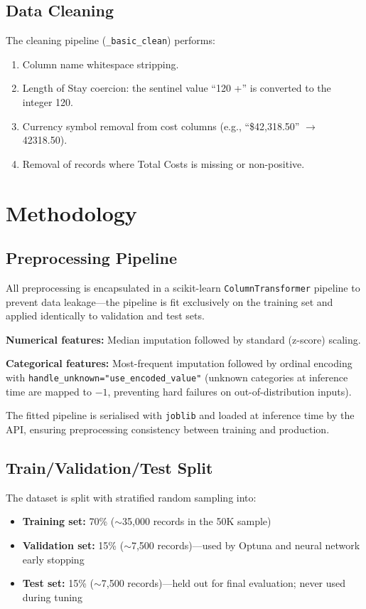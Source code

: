 \documentclass[11pt,a4paper]{article}
\begin{document}
\subsection{Data Cleaning}
The cleaning pipeline (\texttt{\_basic\_clean}) performs:
\begin{enumerate}
  \item Column name whitespace stripping.
  \item Length of Stay coercion: the sentinel value ``120 +'' is converted to the integer 120.
  \item Currency symbol removal from cost columns (e.g., ``\$42,318.50'' $\rightarrow$ 42318.50).
  \item Removal of records where Total Costs is missing or non-positive.
\end{enumerate}

\section{Methodology}
\subsection{Preprocessing Pipeline}
All preprocessing is encapsulated in a scikit-learn \texttt{ColumnTransformer} pipeline to prevent data leakage---the pipeline is fit exclusively on the training set and applied identically to validation and test sets.

\textbf{Numerical features:} Median imputation followed by standard (z-score) scaling.

\textbf{Categorical features:} Most-frequent imputation followed by ordinal encoding with \texttt{handle\_unknown="use\_encoded\_value"} (unknown categories at inference time are mapped to $-1$, preventing hard failures on out-of-distribution inputs).

The fitted pipeline is serialised with \texttt{joblib} and loaded at inference time by the API, ensuring preprocessing consistency between training and production.

\subsection{Train/Validation/Test Split}
The dataset is split with stratified random sampling into:
\begin{itemize}
  \item \textbf{Training set:} 70\% ($\sim$35,000 records in the 50K sample)
  \item \textbf{Validation set:} 15\% ($\sim$7,500 records)---used by Optuna and neural network early stopping
  \item \textbf{Test set:} 15\% ($\sim$7,500 records)---held out for final evaluation; never used during tuning
\end{itemize}
\end{document}
